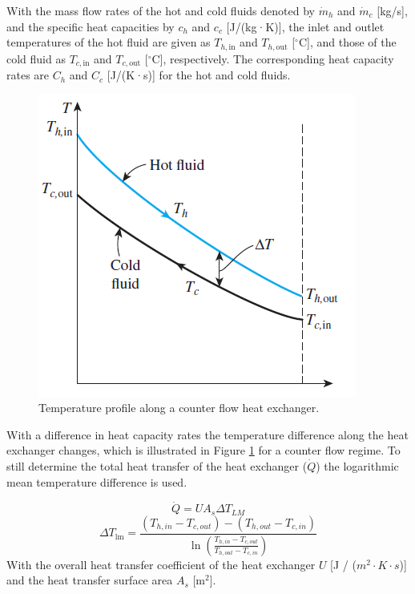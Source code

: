 With the mass flow rates of the hot and cold fluids denoted by \( \dot{m}_h \) and \( \dot{m}_c \) [kg/s], and the specific heat capacities by \( c_h \) and \( c_c \) [J/(kg·K)], the inlet and outlet temperatures of the hot fluid are given as \( T_{h,\text{in}} \) and \( T_{h,\text{out}} \) [\( ^\circ \)C], and those of the cold fluid as \( T_{c,\text{in}} \) and \( T_{c,\text{out}} \) [\( ^\circ \)C], respectively. The corresponding heat capacity rates are \( C_h \) and \( C_c \) [J/(K·s)] for the hot and cold fluids.


\begin{figure}[h!]
    \centering
    \includegraphics[width=0.4\linewidth]{Literature Survey - DCSC template/figuresLIT/heatexchangerTemperatureprofile.png}
    \caption{Temperature profile along a counter flow heat exchanger.}
    \label{fig::counterflowHEX}
\end{figure}
 With a difference in heat capacity rates the temperature difference along the heat exchanger changes, which is illustrated in Figure \ref{fig::counterflowHEX} for a counter flow regime. To still determine the total heat transfer of the heat exchanger ($\dot{Q}$) the logarithmic mean temperature difference is used. 

\begin{equation}
    \dot{Q} =  U A_{s} \Delta T_{LM}
\end{equation}
\begin{equation}
\Delta T_{\operatorname{lm}}=\frac{(T_{h,in} - T_{c,out}) - (T_{h,out} - T_{c,in})}{\ln \left(\frac{T_{h,in} - T_{c,out}}{T_{h,out} - T_{c,in}}\right)}
\end{equation}
With the overall heat transfer coefficient of the heat exchanger $U$ [J / ($m^2 \cdot K \cdot s$)] and the heat transfer surface area $A_{s}$ [m$^2$].

